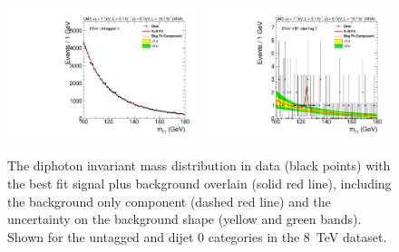 \begin{figure}
  \includegraphics[width=0.49\textwidth]{results/plots/mgg-cats/mgg_mva_nosub_ch2_cat4_8TeV.pdf}
  \includegraphics[width=0.49\textwidth]{results/plots/mgg-cats/mgg_mva_nosub_ch2_cat5_8TeV.pdf}
  \caption{The diphoton invariant mass distribution in data (black points) with the best fit signal plus background overlain (solid red line), including the background only component (dashed red line) and the uncertainty on the background shape (yellow and green bands). Shown for the untagged and dijet 0 categories in the 8~TeV dataset.}
  \label{fig:bfres3}
\end{figure}

